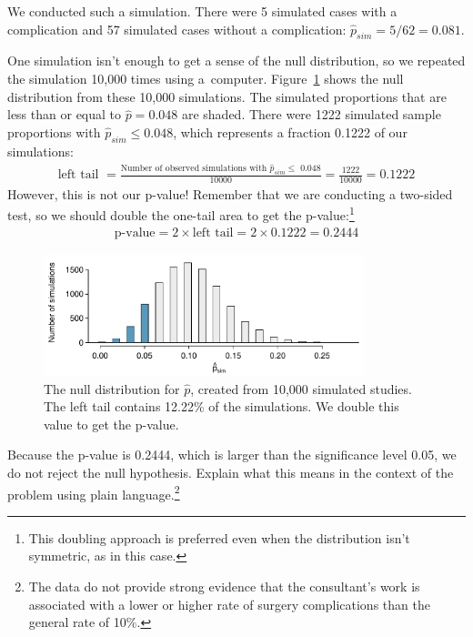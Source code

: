We conducted such a simulation. There were 5 simulated cases with a complication and 57 simulated cases without a complication: $\hat{p}_{sim} = 5/62 = 0.081$.

One simulation isn't enough to get a sense of the null distribution, so we repeated the simulation 10,000 times using a~computer. Figure~\ref{MedConsNullSim} shows the null distribution from these 10,000 simulations. The simulated proportions that are less than or equal to $\hat{p}=0.048$ are shaded. There were 1222 simulated sample proportions with $\hat{p}_{sim} \leq 0.048$, which represents a fraction 0.1222 of our simulations:
\begin{align*}
\text{left tail }
	= \frac{\text{Number of observed simulations with }\hat{p}_{sim}\leq\text{ 0.048}}{10000}
	= \frac{1222}{10000} = 0.1222
\end{align*}
However, this is not our p-value! Remember that we are conducting a two-sided test, so we should double the one-tail area to get the p-value:\footnote{This doubling approach is preferred even when the distribution isn't symmetric, as in this case.}
\begin{align*}
\text{p-value} = 2 \times \text{left tail} = 2 \times 0.1222 = 0.2444
\end{align*}

\begin{figure}[ht]
\centering
\includegraphics[width=0.83\textwidth]{02/figures/MedicalConsultant/MedConsNullSim}
\caption{The null distribution for $\hat{p}$, created from 10,000 simulated studies. The left tail contains 12.22\% of the simulations. We double this value to get the p-value.}
\label{MedConsNullSim}
\end{figure}

\begin{exercise} \label{plainLanguageExplanationOfHTConclusionForLiverDonorSurgicalConsultant}
Because the p-value is 0.2444, which is larger than the significance level 0.05, we do not reject the null hypothesis. Explain what this means in the context of the problem using plain language.\footnote{The data do not provide strong evidence that the consultant's work is associated with a lower or higher rate of surgery complications than the general rate of 10\%.}
\end{exercise}

